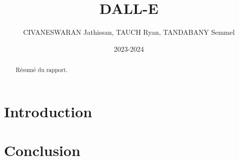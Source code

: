 \documentclass[a4paper,12pt]{article}
\title{DALL-E}
\author{CIVANESWARAN Jathissan, TAUCH Ryan, TANDABANY Semmel}
\date{2023-2024}
\begin{document}
\maketitle

\begin{abstract}
  Résumé du rapport.
\end{abstract}


\section{Introduction}




\section{Conclusion}




\end{document}
